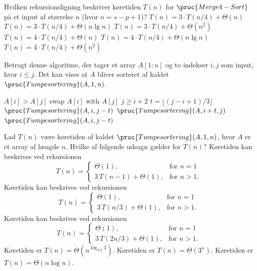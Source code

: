 \noindent
Hvilken rekursionsligning beskriver køretiden $T(n)$ for $\proc{Merge4-Sort}$ på et input af størrelse $n$ (hvor $n=s-p+1$)?
\etsvar
\mulighederstart
\svar $T(n) = 3\cdot T(n/4) + \Theta(n)$
\svar $T(n) = 3\cdot T(n/4) + \Theta(n\lg n)$
\svar $T(n) = 3\cdot T(n/4) + \Theta(n^2)$
\svar $T(n) = 4\cdot T(n/4) + \Theta(n)$ \korrekt
\svar $T(n) = 4\cdot T(n/4) + \Theta(n\lg n)$
\svar $T(n) = 4\cdot T(n/4) + \Theta(n^2)$
\mulighederslut
{}

Betragt denne algoritme, der tager et array $A[1:n]$ og to indekser $i,j$ som input, hvor $i\leq j$.
Det kan vises at $A$ bliver sorteret af kaldet $\proc{Tumpesortering}(A, 1, n)$.
\begin{codebox}
\li \If $A[i] > A[j]$ \Then
\li     swap $A[i]$ with $A[j]$
    \End
\li \If $j \geq i + 2$ \Then
\li     $t = \lfloor (j - i + 1) / 3 \rfloor$
\li     $\proc{Tumpesortering}(A, i, j - t)$
\li     $\proc{Tumpesortering}(A, i + t, j)$
\li     $\proc{Tumpesortering}(A, i, j - t)$
    \End
\end{codebox}
Lad $T(n)$ være køretiden af kaldet $\proc{Tumpesortering}(A, 1, n)$, hvor $A$ er et array af længde $n$.
Hvilke af følgende udsagn gælder for $T(n)$?
\fleresvar
\mulighederstart
\svar Køretiden kan beskrives ved rekursionen
\[
T(n) =
\begin{cases} 
\Theta(1), & \text{for } n = 1 \\
3\,T(n-1) + \Theta(1), & \text{for } n > 1.
\end{cases}
\]
\svar Køretiden kan beskrives ved rekursionen
\[
T(n) =
\begin{cases} 
\Theta(1), & \text{for } n = 1 \\
3\,T(n/3) + \Theta(1), & \text{for } n > 1.
\end{cases}
\]
\svar Køretiden kan beskrives ved rekursionen \korrekt
\[
T(n) =
\begin{cases} 
\Theta(1), & \text{for } n = 1 \\
3\,T(2n/3) + \Theta(1), & \text{for } n > 1.
\end{cases}
\]
\svar Køretiden er $T(n)=\Theta(n^{\log_{3/2}3})$.\korrekt
{}
\svar Køretiden er $T(n)=\Theta(3^n)$.
\svar Køretiden er $T(n)=\Theta(n \log n)$.
\mulighederslut
{}

